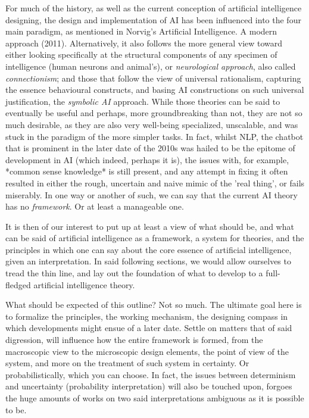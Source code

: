 For much of the history, as well as the current conception of artificial intelligence designing, the design and implementation of AI has been influenced into the four main paradigm, as mentioned in Norvig's Artificial Intelligence. A modern approach (2011). Alternatively, it also follows the more general view toward either looking specifically at the structural components of any specimen of intelligence (human neurons and animal's), or \textit{neurological approach}, also called \textit{connectionism}; and those that follow the view of universal rationalism, capturing the essence behavioural constructs, and basing AI constructions on such universal justification, the \textit{symbolic AI} approach. While those theories can be said to eventually be useful and perhaps, more groundbreaking than not, they are not so much desirable, as they are also very well-being specialized, unscalable, and was stuck in the paradigm of the more simpler tasks. In fact, whilst NLP, the chatbot that is prominent in the later date of the 2010s was hailed to be the epitome of development in AI (which indeed, perhaps it is), the issues with, for example, *common sense knowledge* is still present, and any attempt in fixing it often resulted in either the rough, uncertain and naive mimic of the 'real thing', or fails miserably. In one way or another of such, we can say that the current AI theory has no \textit{framework}. Or at least a manageable one. 

It is then of our interest to put up at least a view of what should be, and what can be said of artificial intelligence as a framework, a system for theories, and the principles in which one can say about the core essence of artificial intelligence, given an interpretation. In said following sections, we would allow ourselves to tread the thin line, and lay out the foundation of what to develop to a full-fledged artificial intelligence theory. 

What should be expected of this outline? Not so much. The ultimate goal here is to formalize the principles, the working mechanism, the designing compass in which developments might ensue of a later date. Settle on matters that of said digression, will influence how the entire framework is formed, from the macroscopic view to the microscopic design elements, the point of view of the system, and more on the treatment of such system in certainty. Or probabilistically, which you can choose. In fact, the issues between determinism and uncertainty (probability interpretation) will also be touched upon, forgoes the huge amounts of works on two said interpretations ambiguous as it is possible to be. 
